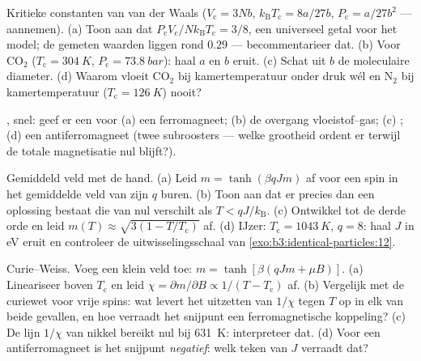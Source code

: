 \begin{exercise}[$\star$]\label{exo:b3:phase-transitions:3}
Kritieke constanten van van der Waals ($V_{\text{c}} = 3Nb$,
$k_{\text{B}}T_{\text{c}} = 8a/27b$, $P_{\text{c}} = a/27b^2$ ---
aannemen). (a) Toon aan dat $P_{\text{c}}V_{\text{c}}/Nk_{\text{B}}T_{\text{
c}} = 3/8$, een universeel getal voor het model; de gemeten waarden
liggen rond $0.29$ --- becommentarieer dat. (b) Voor CO$_2$
($T_{\text{c}} = \qty{304}{K}$, $P_{\text{c}} = \qty{73.8}{bar}$):
haal $a$ en $b$ eruit. (c) Schat uit $b$ de moleculaire
diameter. (d) Waarom vloeit CO$_2$ bij kamertemperatuur onder druk
wél en N$_2$ bij kamertemperatuur ($T_{\text{c}} =
\qty{126}{K}$) nooit?
\end{exercise}

\begin{exercise}[$\star$]\label{exo:b3:phase-transitions:4}
, snel: geef er een voor (a) een ferromagneet; (b)
de overgang vloeistof--gas; (c) ; (d)
een antiferromagneet (twee subroosters --- welke grootheid ordent er
terwijl de totale magnetisatie nul blijft?).
\end{exercise}

\begin{exercise}[$\star\star$]\label{exo:b3:phase-transitions:5}
Gemiddeld veld met de hand. (a) Leid $m = \tanh(\beta qJm)$ af voor een
spin in het gemiddelde veld van zijn $q$ buren. (b) Toon aan dat er precies
dan een oplossing bestaat die van nul verschilt als $T < qJ/k_{\text{B}}$. (c) Ontwikkel tot
de derde orde en leid $m(T) \approx \sqrt{3(1 -
T/T_{\text{c}})}$ af. (d) IJzer: $T_{\text{c}} = \qty{1043}{K}$, $q =
8$: haal $J$ in eV eruit en controleer de uitwisselingsschaal van
\cref{exo:b3:identical-particles:12}.
\end{exercise}

\begin{exercise}[$\star\star$]\label{exo:b3:phase-transitions:6}
Curie--Weiss. Voeg een klein veld toe: $m = \tanh[\beta(qJm + \mu B)]$.
(a) Lineariseer boven $T_{\text{c}}$ en leid $\chi = \partial
m/\partial B \propto 1/(T - T_{\text{c}})$ af. (b) Vergelijk met de
curiewet voor vrije spins: wat levert het uitzetten van $1/\chi$ tegen $T$ op
in elk van beide gevallen, en hoe verraadt het snijpunt een ferromagnetische
koppeling? (c) De lijn $1/\chi$ van nikkel bereikt nul bij \qty{631}{K}:
interpreteer dat. (d) Voor een antiferromagneet is het snijpunt
\emph{negatief}: welk teken van $J$ verraadt dat?
\end{exercise}

